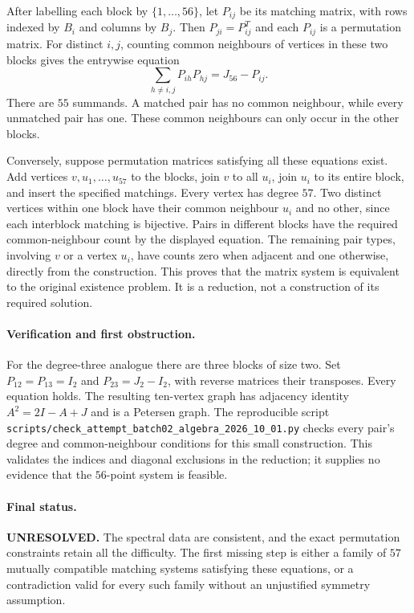 \documentclass[11pt,a4paper]{article}
\begin{document}
After labelling each block by $\{1,\ldots,56\}$, let $P_{ij}$ be its
matching matrix, with rows indexed by $B_i$ and columns by $B_j$.
Then $P_{ji}=P_{ij}^{T}$ and each $P_{ij}$ is a permutation matrix.
For distinct $i,j$, counting common neighbours of vertices in these two
blocks gives the entrywise equation
\[
 \boxed{\ \sum_{h\ne i,j}P_{ih}P_{hj}=J_{56}-P_{ij}.\ }
\]
There are $55$ summands. A matched pair has no common neighbour, while
every unmatched pair has one. These common neighbours can only occur
in the other blocks.

Conversely, suppose permutation matrices satisfying all these equations
exist. Add vertices $v,u_1,\ldots,u_{57}$ to the blocks, join $v$ to
all $u_i$, join $u_i$ to its entire block, and insert the specified
matchings. Every vertex has degree $57$. Two distinct vertices within
one block have their common neighbour $u_i$ and no other, since each
interblock matching is bijective. Pairs in different blocks have the
required common-neighbour count by the displayed equation. The remaining
pair types, involving $v$ or a vertex $u_i$, have counts zero when
adjacent and one otherwise, directly from the construction. This proves
that the matrix system is equivalent to the original existence problem.
It is a reduction, not a construction of its required solution.

\paragraph{Verification and first obstruction.}
For the degree-three analogue there are three blocks of size two. Set
$P_{12}=P_{13}=I_2$ and $P_{23}=J_2-I_2$, with reverse matrices their
transposes. Every equation holds. The resulting ten-vertex graph has
adjacency identity $A^2=2I-A+J$ and is a Petersen graph. The reproducible
script \texttt{scripts/check\_attempt\_batch02\_algebra\_2026\_10\_01.py}
checks every pair's degree and common-neighbour conditions for this
small construction. This validates the indices and diagonal exclusions
in the reduction; it supplies no evidence that the $56$-point system
is feasible.

\paragraph{Final status.}
\textbf{UNRESOLVED.} The spectral data are consistent, and the exact
permutation constraints retain all the difficulty. The first missing
step is either a family of $57$ mutually compatible matching systems
satisfying these equations, or a contradiction valid for every such
family without an unjustified symmetry assumption.
\end{document}
